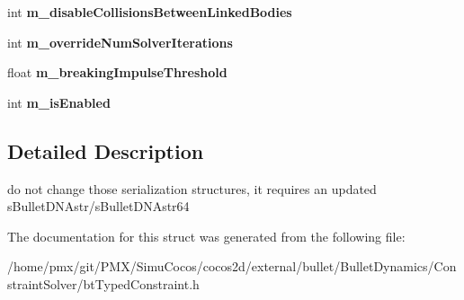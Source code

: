 \begin{DoxyCompactItemize}
\item 
\mbox{\label{structbtTypedConstraintFloatData_a1ac678e96795aa0e69e4f60d05a90a7e}} 
int {\bfseries m\+\_\+disable\+Collisions\+Between\+Linked\+Bodies}
\item 
\mbox{\label{structbtTypedConstraintFloatData_af232f50b9f2b39f341cfbaecacb28fc8}} 
int {\bfseries m\+\_\+override\+Num\+Solver\+Iterations}
\item 
\mbox{\label{structbtTypedConstraintFloatData_aa388e15d0baab4a073d37114783def55}} 
float {\bfseries m\+\_\+breaking\+Impulse\+Threshold}
\item 
\mbox{\label{structbtTypedConstraintFloatData_a9b529fe525394321de1bcbf4c7d1f5d3}} 
int {\bfseries m\+\_\+is\+Enabled}
\end{DoxyCompactItemize}


\subsection{Detailed Description}
do not change those serialization structures, it requires an updated s\+Bullet\+D\+N\+Astr/s\+Bullet\+D\+N\+Astr64 

The documentation for this struct was generated from the following file\+:\begin{DoxyCompactItemize}
\item 
/home/pmx/git/\+P\+M\+X/\+Simu\+Cocos/cocos2d/external/bullet/\+Bullet\+Dynamics/\+Constraint\+Solver/bt\+Typed\+Constraint.\+h\end{DoxyCompactItemize}

